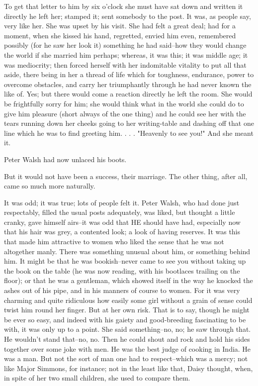 \documentclass[lang=cn,10pt]{elegantbook}
\begin{document}
To get that letter to him by six o'clock she must have sat down and
written it directly he left her; stamped it; sent somebody to the
post.  It was, as people say, very like her.  She was upset by his
visit.  She had felt a great deal; had for a moment, when she
kissed his hand, regretted, envied him even, remembered possibly
(for he saw her look it) something he had said--how they would
change the world if she married him perhaps; whereas, it was this;
it was middle age; it was mediocrity; then forced herself with her
indomitable vitality to put all that aside, there being in her a
thread of life which for toughness, endurance, power to overcome
obstacles, and carry her triumphantly through he had never known
the like of.  Yes; but there would come a reaction directly he left
the room.  She would be frightfully sorry for him; she would think
what in the world she could do to give him pleasure (short always
of the one thing) and he could see her with the tears running down
her cheeks going to her writing-table and dashing off that one line
which he was to find greeting him. . . .  "Heavenly to see you!"
And she meant it.

Peter Walsh had now unlaced his boots.

But it would not have been a success, their marriage.  The other
thing, after all, came so much more naturally.

It was odd; it was true; lots of people felt it.  Peter Walsh, who
had done just respectably, filled the usual posts adequately, was
liked, but thought a little cranky, gave himself airs--it was odd
that HE should have had, especially now that his hair was grey, a
contented look; a look of having reserves.  It was this that made
him attractive to women who liked the sense that he was not
altogether manly.  There was something unusual about him, or
something behind him.  It might be that he was bookish--never came
to see you without taking up the book on the table (he was now
reading, with his bootlaces trailing on the floor); or that he was
a gentleman, which showed itself in the way he knocked the ashes
out of his pipe, and in his manners of course to women.  For it was
very charming and quite ridiculous how easily some girl without a
grain of sense could twist him round her finger.  But at her own
risk.  That is to say, though he might be ever so easy, and indeed
with his gaiety and good-breeding fascinating to be with, it was
only up to a point.  She said something--no, no; he saw through
that.  He wouldn't stand that--no, no.  Then he could shout and
rock and hold his sides together over some joke with men.  He was
the best judge of cooking in India.  He was a man.  But not the
sort of man one had to respect--which was a mercy; not like Major
Simmons, for instance; not in the least like that, Daisy thought,
when, in spite of her two small children, she used to compare them.
\end{document}
